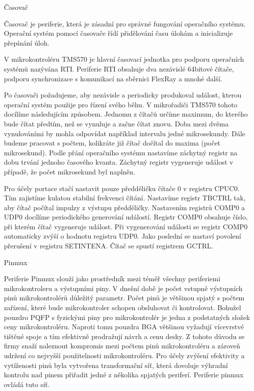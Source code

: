 \secc        Časovač

	Časovač je periferie, která je zásadní pro správné fungování operačního systému.
Operační systém pomocí časovače řídí přidělování času úlohám a inicializuje přepínání úloh. 

V mikrokontroléru TMS570 je hlavní časovací jednotka pro podporu operačních systémů nazývána RTI.
Periferie RTI obsahuje dva nezávislé 64bitové čítače, podporu synchronizace s komunikací na sběrnici FlexRay a mnohé další.

Po časovači požadujeme, aby nezávisle a periodicky produkoval událost, kterou operační systém použije pro řízení svého běhu.
V mikrořadiči TMS570 tohoto docílíme následujícím způsobem.
Jednomu z čítačů určíme maximum, do kterého bude čítat předtím, než se vynuluje a začne čítat znovu.
Doba mezi dvěma vynulováními by mohla odpovídat například intervalu jedné mikrosekundy.
Dále budeme pracovat s počtem, kolikráte již čítač dočítal do maxima (počet mikrosekund).
Podle přání operačního systému nastavíme záchytný registr na dobu trvání jednoho časového kvanta.
Záchytný registr vygeneruje událost v případě, že počet mikrosekund byl naplněn.

Pro účely portace stačí nastavit pouze předděličku čítače 0 v registru CPUC0.
Tím zajistíme kulatou stabilní frekvenci čítání.
Nastavíme registr TBCTRL tak, aby čítač počítal impulzy z výstupu předděličky.
Nastavením registrů COMP0 a UDP0 docílíme periodického generování událostí.
Registr COMP0 obsahuje číslo, při kterém čítač vygeneruje událost.
Při vygenerování události se registr COMP0 automaticky zvýší o hodnotu registru UDP0.
Jako poslední se nastaví povolení přerušení v registru SETINTENA.
Čítač se spustí registrem GCTRL.

\secc    Pinmux

Periferie Pinmux slouží jako prostředník mezi téměř všechny periferiemi mikrokontroleru a výstupními piny.
V dnešní době je počet vstupně výstupních pinů mikrokontrolérů důležitý parametr.
Počet pinů je většinou spjatý s počtem zařízení, které bude mikrokontroler schopen obsluhovat či kontrolovat.
Bohužel pouzdro PQFP s fyzickými piny pro mikrokontrolér je jedna z podstatných složek ceny mikrokontroléru.
Naproti tomu pouzdra BGA většinou vyžadují vícevrstvé tištěné spoje a tím efektivně prodražují návrh a cenu desky.
Z tohoto důvodu se firmy snaží naleznout kompromis mezi počtem pinů mikrokontroléru a zároveň udržení co nejvyšší použitelnosti mikrokontroléru.
Pro účely zvýšení efektivity a vytíženosti pinů byla vytvořena transformační síť, která dovoluje výhradní kontrolu nad pinem přiřadit jedné z několika spjatých periferí.
Periferie pinmux ovládá tuto síť.

